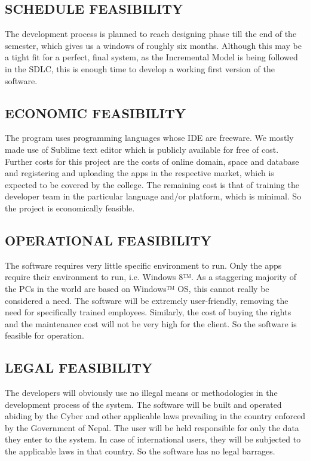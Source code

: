 \documentclass[12pt,a4paper]{article}
\begin{document}
    \subsection{SCHEDULE FEASIBILITY}
    The development process is planned to reach designing phase till the end of the semester, which gives us a windows of roughly six months. Although this may be a tight fit for a perfect, final system, as the Incremental Model is being followed in the SDLC, this is enough time to develop a working first version of the software.
    
    \subsection{ECONOMIC FEASIBILITY}
    The program uses programming languages whose IDE are freeware. We mostly made use of Sublime text editor which is publicly available for free of cost. Further costs for this project are the costs of online domain, space and database and registering and uploading the apps in the respective market, which is expected to be covered by the college. The remaining cost is that of training the developer team in the particular language and/or platform, which is minimal. So the project is economically feasible.
    
    \subsection{OPERATIONAL FEASIBILITY}
    The software requires very little specific environment to run. Only the apps require their environment to run, i.e. Windows 8™. As a staggering majority of the PCs in the world are based on Windows™ OS, this cannot really be considered a need. The software will be extremely user-friendly, removing the need for specifically trained employees. Similarly, the cost of buying the rights and the maintenance cost will not be very high for the client. So the software is feasible for operation.
    
    \subsection{LEGAL FEASIBILITY}
    The developers will obviously use no illegal means or methodologies in the development process of the system. The software will be built and operated abiding by the Cyber and other applicable laws prevailing in the country enforced by the Government of Nepal. The user will be held responsible for only the data they enter to the system. In case of international users, they will be subjected to the applicable laws in that country. So the software has no legal barrages.
    
\end{document}
